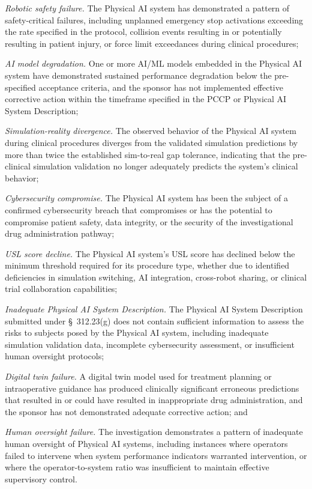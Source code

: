 \documentclass[11pt]{article}
\begin{document}
\begin{description}[leftmargin=0.8cm,style=sameline]
\item[(i)] \textit{Robotic safety failure.} The Physical AI system has demonstrated a pattern of safety-critical failures, including unplanned emergency stop activations exceeding the rate specified in the protocol, collision events resulting in or potentially resulting in patient injury, or force limit exceedances during clinical procedures;
\item[(ii)] \textit{AI model degradation.} One or more AI/ML models embedded in the Physical AI system have demonstrated sustained performance degradation below the pre-specified acceptance criteria, and the sponsor has not implemented effective corrective action within the timeframe specified in the PCCP or Physical AI System Description;
\item[(iii)] \textit{Simulation-reality divergence.} The observed behavior of the Physical AI system during clinical procedures diverges from the validated simulation predictions by more than twice the established sim-to-real gap tolerance, indicating that the pre-clinical simulation validation no longer adequately predicts the system's clinical behavior;
\item[(iv)] \textit{Cybersecurity compromise.} The Physical AI system has been the subject of a confirmed cybersecurity breach that compromises or has the potential to compromise patient safety, data integrity, or the security of the investigational drug administration pathway;
\item[(v)] \textit{USL score decline.} The Physical AI system's USL score has declined below the minimum threshold required for its procedure type, whether due to identified deficiencies in simulation switching, AI integration, cross-robot sharing, or clinical trial collaboration capabilities;
\item[(vi)] \textit{Inadequate Physical AI System Description.} The Physical AI System Description submitted under \S~312.23(g) does not contain sufficient information to assess the risks to subjects posed by the Physical AI system, including inadequate simulation validation data, incomplete cybersecurity assessment, or insufficient human oversight protocols;
\item[(vii)] \textit{Digital twin failure.} A digital twin model used for treatment planning or intraoperative guidance has produced clinically significant erroneous predictions that resulted in or could have resulted in inappropriate drug administration, and the sponsor has not demonstrated adequate corrective action; and
\item[(viii)] \textit{Human oversight failure.} The investigation demonstrates a pattern of inadequate human oversight of Physical AI systems, including instances where operators failed to intervene when system performance indicators warranted intervention, or where the operator-to-system ratio was insufficient to maintain effective supervisory control.
\end{description}
\end{document}

